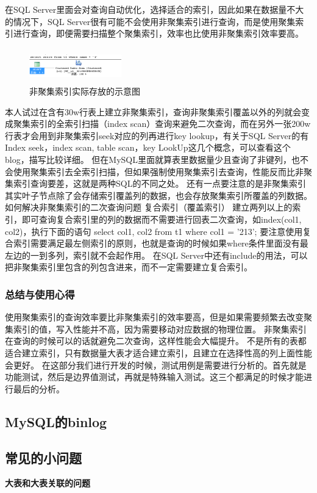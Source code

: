 \documentclass[UTF8]{ctexart}
\begin{document}
在SQL Server里面会对查询自动优化，选择适合的索引，因此如果在数据量不大的情况下，SQL Server很有可能不会使用非聚集索引进行查询，而是使用聚集索引进行查询，即便需要扫描整个聚集索引，效率也比使用非聚集索引效率要高。
\begin{figure}[htbp]
\centering
\includegraphics[height=1.5cm,width=4cm]{Figure/index3.png}
\caption{非聚集索引实际存放的示意图}
\end{figure}
本人试过在含有30w行表上建立非聚集索引，查询非聚集索引覆盖以外的列就会变成聚集索引的全索引扫描（index scan）查询来避免二次查询，而在另外一张200w行表才会用到非聚集索引seek对应的列再进行key lookup，有关于SQL Server的有Index seek，index scan, table scan，key LookUp这几个概念，可以查看这个blog，描写比较详细。
但在MySQL里面就算表里数据量少且查询了非键列，也不会使用聚集索引去全索引扫描，但如果强制使用聚集索引去查询，性能反而比非聚集索引查询要差，这就是两种SQL的不同之处。
还有一点要注意的是非聚集索引其实叶子节点除了会存储索引覆盖列的数据，也会存放聚集索引所覆盖的列数据。
如何解决非聚集索引的二次查询问题
复合索引（覆盖索引）
建立两列以上的索引，即可查询复合索引里的列的数据而不需要进行回表二次查询，如index(col1, col2)，执行下面的语句
select col1, col2 from t1 where col1 = '213';
要注意使用复合索引需要满足最左侧索引的原则，也就是查询的时候如果where条件里面没有最左边的一到多列，索引就不会起作用。
在SQL Server中还有include的用法，可以把非聚集索引里包含的列包含进来，而不一定需要建立复合索引。
\subsubsection{总结与使用心得}
使用聚集索引的查询效率要比非聚集索引的效率要高，但是如果需要频繁去改变聚集索引的值，写入性能并不高，因为需要移动对应数据的物理位置。
非聚集索引在查询的时候可以的话就避免二次查询，这样性能会大幅提升。
不是所有的表都适合建立索引，只有数据量大表才适合建立索引，且建立在选择性高的列上面性能会更好。
在这部分我们进行开发的时候，测试用例是需要进行分析的。首先就是功能测试，然后是边界值测试，再就是特殊输入测试。这三个都满足的时候才能进行最后的分析。


\subsection{MySQL的binlog}



\subsection{常见的小问题}
\textbf{大表和大表关联的问题}
\end{document}
